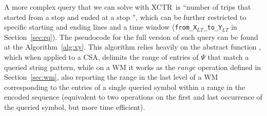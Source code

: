 \documentclass[runningheads]{llncs}
\newcommand{\ctr}{XCTR}
\begin{document}
A more complex query that we can solve with \ctr~is ``number of trips that started from a stop  and ended at a stop '', which can be further restricted to specific starting and ending lines and a time window (\texttt{from\_X$_{LT}$\_to\_Y$_{LT}$} in Section~\ref{sec:rq}). The pseudocode for the full version of such query can be found at the Algorithm~\ref{alg:xy}. This algorithm relies heavily on the abstract function , which when applied to a CSA, delimits the range of entries of $\Psi$ that match a queried string pattern, while on a WM it works as the $range$ operation defined in Section~\ref{sec:wm}, also reporting the range in the last level of a WM corresponding to the entries of a single queried symbol within a range in the encoded sequence (equivalent to two  operations on the first and last occurrence of the queried symbol, but more time efficient).

\begin{algorithm}[hbt!]
 
 
 \caption{Querying for all features on \ctr}
 \label{alg:xy}
\end{algorithm}
\end{document}
